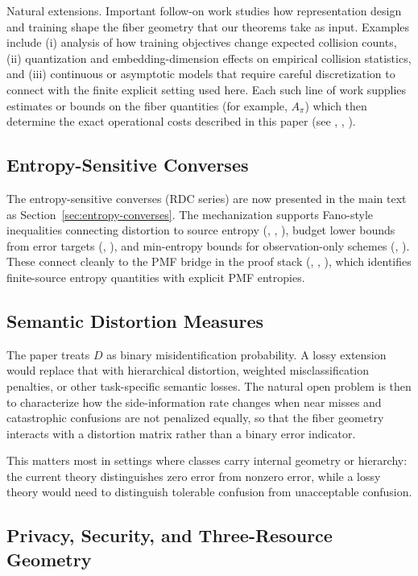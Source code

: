 Natural extensions. Important follow-on work studies how representation design and training shape the fiber geometry that our theorems take as input. Examples include (i) analysis of how training objectives change expected collision counts, (ii) quantization and embedding-dimension effects on empirical collision statistics, and (iii) continuous or asymptotic models that require careful discretization to connect with the finite explicit setting used here. Each such line of work supplies estimates or bounds on the fiber quantities (for example, $A_\pi$) which then determine the exact operational costs described in this paper (see , , ).

\subsection{Entropy-Sensitive Converses}

The entropy-sensitive converses (RDC series) are now presented in the main text as Section~\ref{sec:entropy-converses}. The mechanization supports Fano-style inequalities connecting distortion to source entropy (, , ), budget lower bounds from error targets (, ), and min-entropy bounds for observation-only schemes (, ). These connect cleanly to the PMF bridge in the proof stack (, , ), which identifies finite-source entropy quantities with explicit PMF entropies.

\subsection{Semantic Distortion Measures}

The paper treats $D$ as binary misidentification probability. A lossy extension would replace that with hierarchical distortion, weighted misclassification penalties, or other task-specific semantic losses. The natural open problem is then to characterize how the side-information rate changes when near misses and catastrophic confusions are not penalized equally, so that the fiber geometry interacts with a distortion matrix rather than a binary error indicator.

This matters most in settings where classes carry internal geometry or hierarchy: the current theory distinguishes zero error from nonzero error, while a lossy theory would need to distinguish tolerable confusion from unacceptable confusion.

\subsection{Privacy, Security, and Three-Resource Geometry}

